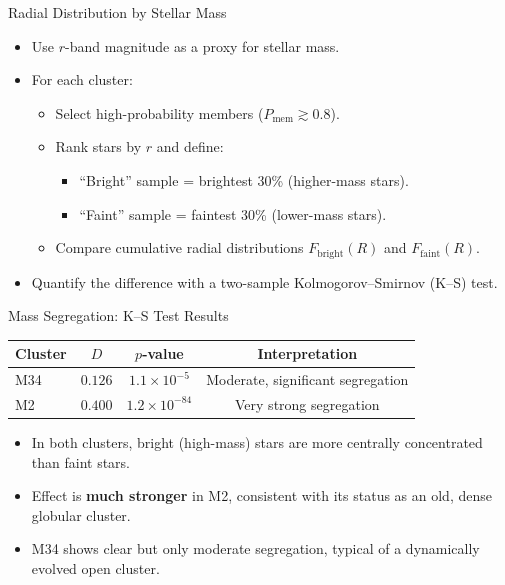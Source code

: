 \documentclass{beamer}
\begin{document}
\begin{frame}{Radial Distribution by Stellar Mass}
    \begin{itemize}
        \item Use $r$-band magnitude as a proxy for stellar mass.
        \item For each cluster:
        \begin{itemize}
            \item Select high-probability members ($P_{\mathrm{mem}} \gtrsim 0.8$).
            \item Rank stars by $r$ and define:
            \begin{itemize}
                \item ``Bright'' sample = brightest 30\% (higher-mass stars).
                \item ``Faint'' sample = faintest 30\% (lower-mass stars).
            \end{itemize}
            \item Compare cumulative radial distributions $F_{\mathrm{bright}}(R)$ and $F_{\mathrm{faint}}(R)$.
        \end{itemize}
        \item Quantify the difference with a two-sample Kolmogorov--Smirnov (K--S) test.
    \end{itemize}
\end{frame}


\begin{frame}{Mass Segregation: K--S Test Results}
    \begin{table}
        \centering
        \begin{tabular}{lccc}
            \toprule
            \textbf{Cluster} & $D$ & $p$-value & Interpretation \\
            \midrule
            M34 & $0.126$ & $1.1\times 10^{-5}$ & Moderate, significant segregation \\
            M2  & $0.400$ & $1.2\times 10^{-84}$ & Very strong segregation \\
            \bottomrule
        \end{tabular}
    \end{table}
    \begin{itemize}
        \item In both clusters, bright (high-mass) stars are more centrally concentrated than faint stars.
        \item Effect is \textbf{much stronger} in M2, consistent with its status as an old, dense globular cluster.
        \item M34 shows clear but only moderate segregation, typical of a dynamically evolved open cluster.
    \end{itemize}
\end{frame}
\end{document}
